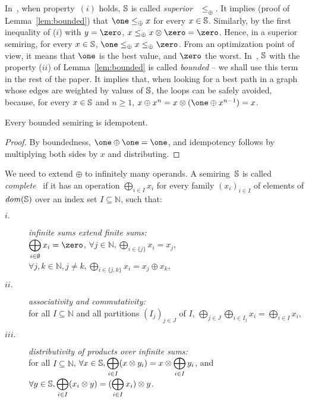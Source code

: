 In~\cite{Huang08advanceddynamic}, when  property~$(i)$ holds,
$\mathbb{S}$ is called \emph{superior} \wrt~$\leq_\oplus$.
It implies (proof of Lemma~\ref{lem:bounded})
that
$\one \leq_\oplus x$ for every $x \in \mathbb{S}$.
Similarly, by the first inequality of ($i$) with $y = \zero$,
$x \leq_\oplus x \otimes \zero = \zero$.
%
Hence, in a superior semiring,
for every $x \in \mathbb{S}$, $\one \leq_\oplus x \leq_\oplus \zero$.
%
From an optimization point of view,
it means that $\one$ is the best value, and $\zero$ the worst.
%
In~\cite{Mohri02semiring},
$\mathbb{S}$ with the property ($ii$) of Lemma~\ref{lem:bounded}
is called \emph{bounded} -- we shall use this term in the rest of the paper.
It implies that, when looking for a best path in a graph whose edges
are weighted by values of $\mathbb{S}$, the loops can be safely avoided,
because, for every $x \in \mathbb{S}$ and $n \geq 1$,
 $x \oplus x^n = x \otimes (\one \oplus x^{n-1}) = x$.


\begin{lemma}\label{lem:idempotent}
Every bounded semiring is idempotent.
\end{lemma}
\begin{proof}
By boundedness, $\one \oplus \one = \one$,
and idempotency follows by multiplying
both sides by $x$ and distributing.
\end{proof}

\noindent
We need to extend $\oplus$ to infinitely many operands.
A semiring~$\mathbb{S}$ is called \emph{complete}~\cite{Droste09handbook}
if it has an %
operation $\bigoplus_{i \in I} x_i$
for every family
$(x_i)_{i \in I}$ %
of elements of $\mathit{dom}(\mathbb{S})$ over an index set $I \subseteq \mathbb{N}$, such that:
\begin{description}
\item[$i.$]
\emph{infinite sums extend finite sums:}\\
$\displaystyle\bigoplus_{i \in \emptyset} x_i = \zero$,\quad
      $\forall j\in \mathbb{N}, \displaystyle\bigoplus_{i \in \{ j \}} x_i = x_j$,
      $\forall j, k\in \mathbb{N}, j\neq k,
      \displaystyle\bigoplus_{i \in \{ j, k \}} x_i = x_j \oplus x_k$,
%
\item[$ii.$]
\emph{associativity and commutativity:}\\
for all $I \subseteq \mathbb{N}$
and all partitions $(I_{j})_{j \in J}$ of $I$, %
\(
\displaystyle
\bigoplus_{j \in J}\bigoplus_{i \in I_j} x_i =
\bigoplus_{i \in I} x_i
\),
%
\item[$iii.$]
\emph{distributivity of products over infinite sums:}\\
for all $I \subseteq \mathbb{N}$, 
\(
\displaystyle
\forall x \in \mathbb{S}, \bigoplus_{i \in I} (x \otimes y_i) = x \otimes \bigoplus_{i\in I} y_i\), and
\(
\displaystyle
\forall y \in \mathbb{S}, \bigoplus_{i \in I} (x_i \otimes y) = (\bigoplus_{i \in I} x_i ) \otimes y\).
\end{description}



